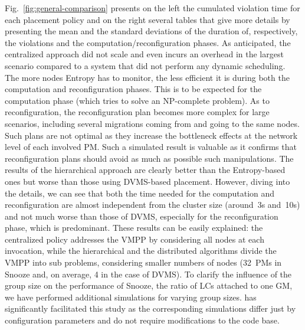 Fig.~\ref{fig:general-comparison} presents on the left the cumulated
violation time for each placement policy and on the right several
tables that give more details by presenting the mean and the standard
deviations of the duration of, respectively, the violations and the
computation/reconfiguration phases. As anticipated, the centralized
approach did not scale and even incurs an overhead in the largest
scenario compared to a system that did not perform any dynamic
scheduling. The more nodes Entropy has to monitor, the less efficient
it is during both the computation and reconfiguration phases.
This is to be expected for the computation phase (which tries to solve
an NP-complete problem).  As to reconfiguration,
the reconfiguration plan becomes more complex for large scenarios,
including several migrations coming from and going to the same
nodes. Such plans are not optimal as they increase the bottleneck
effects at the network level of each involved PM. Such a simulated
result is valuable as it confirms that reconfiguration plans should
avoid as much as possible such manipulations.
%
The results of the hierarchical approach are clearly better than the
Entropy-based ones but worse than those using DVMS-based
placement. However, diving into the details, we can see that both the
time needed for the computation and reconfiguration are almost
independent from the cluster size (around~3s and~10s) and not much
worse than those of DVMS, especially for the reconfiguration phase,
which is predominant. These results can be easily explained: the
centralized policy addresses the VMPP by considering all nodes at each
invocation, while the hierarchical and the distributed algorithms
divide the VMPP into sub problems, considering smaller numbers of
nodes (32~PMs in Snooze and, on average, 4 in the case of DVMS). To
clarify the influence of the group size on the performance of Snooze,
\ie the ratio of LCs attached to one GM, we have performed additional
simulations for varying group sizes.  \vmps has significantly
facilitated this study as the corresponding simulations differ just by
configuration parameters and do not require modifications to the code
base.


